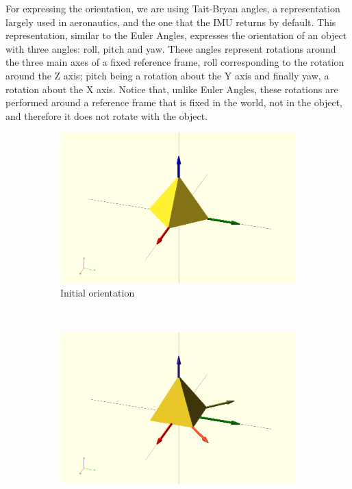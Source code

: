 For expressing the orientation, we are using Tait-Bryan angles, a representation largely used in aeronautics, and the one that the IMU returns by default. This representation, similar to the Euler Angles, expresses the orientation of an object with three angles: roll, pitch and yaw. These angles represent rotations around the three main axes of a fixed reference frame, roll corresponding to the rotation around the Z axis; pitch being a rotation about the Y axis and finally yaw, a rotation about the X axis. Notice that, unlike Euler Angles, these rotations are performed around a reference frame that is fixed in the world, not in the object, and therefore it does not rotate with the object.\\
\begin{figure}[h]
		\centering
        \begin{subfigure}[b]{0.4\textwidth}
                \centering
                \includegraphics[width=\textwidth]{images/Orientation/tait-bryan-01.png}
                \caption{Initial orientation}
                \label{fig:soft_orientation_initial}
        \end{subfigure}
        ~
        \begin{subfigure}[b]{0.4\textwidth}
                \centering
                \includegraphics[width=\textwidth]{images/Orientation/tait-bryan-02.png}

\end{subfigure}
\end{figure}
